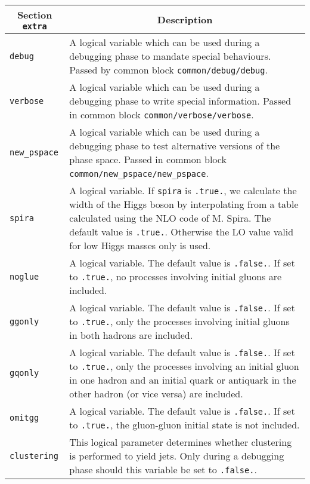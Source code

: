 	\begin{longtable}{p{1.5cm}p{12cm}}
		\hline
		\multicolumn{1}{c}{{\textbf{Section} \texttt{extra}}} & \multicolumn{1}{c}{{\textbf{Description}}} \\ 
		\hline
		{\tt debug} &
		A logical variable which can be used during a 
		debugging phase to mandate special behaviours. 
		Passed by common block {\tt common/debug/debug}. \\
		
		{\tt verbose} &
		A logical variable which can be used during a debugging phase to write 
		special information. Passed in common block {\tt common/verbose/verbose}. \\
		
		{\tt new\_pspace} &
		A logical variable which can be used during a debugging phase to test alternative versions of the phase space.
		Passed in common block {\tt common/new\_pspace/new\_pspace}. \\
		
		{\tt spira} & 
		A logical variable. If {\tt spira} is \texttt{.true.}, we calculate the 
		width of the Higgs boson by interpolating from a table
		calculated using the NLO code of M. Spira. The default value is \texttt{.true.}.
	        Otherwise the LO value valid for low Higgs masses only is used. \\
		
		{\tt noglue} &
		A logical variable. 
		The default value is \texttt{.false.}. If set to \texttt{.true.}, no processes
		involving initial gluons are included. \\
		{\tt ggonly} &
		A logical variable. 
		The default value is \texttt{.false.}. If set to \texttt{.true.}, 
		only the processes
		involving initial gluons in both hadrons are included.\\
		{\tt gqonly} &
		A logical variable. The default value is \texttt{.false.}. If set to \texttt{.true.}, 
		only the processes
		involving an initial gluon in one hadron and an initial quark
		or antiquark in the other hadron (or vice versa) are included.\\
		{\tt omitgg} &
		A logical variable. 
		The default value is \texttt{.false.}. If set to \texttt{.true.}, the gluon-gluon
		initial state is not included.\\
		
		{\tt clustering} &
		This logical parameter determines whether clustering is performed to yield
		jets. Only during a debugging phase should this variable be set to \texttt{.false.}. \\
		

\end{longtable}

